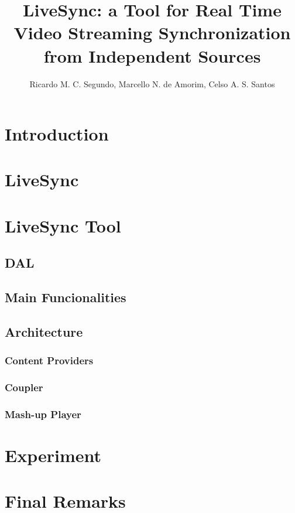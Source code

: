 \documentclass[jidm,a4paper]{jidm} %
\title{LiveSync: a Tool for Real Time Video Streaming Synchronization from Independent Sources}
\author{Ricardo M. C. Segundo\inst{1}, Marcello N. de Amorim\inst{2}, Celso A. S. Santos\inst{3}}
\institute{Federal University of  Espirito Santo, Brazil  \\ \email{rmcs87@gmail.com , novaes@inf.ufes.br , saibel@inf.ufes.br}
}
\begin{document}
\begin{bottomstuff}

\end{bottomstuff}

\maketitle

\section{Introduction}




\section{LiveSync}


\section{LiveSync Tool}


\subsection{DAL}


\subsection{Main Funcionalities}


\subsection{Architecture}


\subsubsection{Content Providers}


\subsubsection{Coupler}


\subsubsection{Mash-up Player}


\section{Experiment}


\section{Final Remarks}




\end{document}
